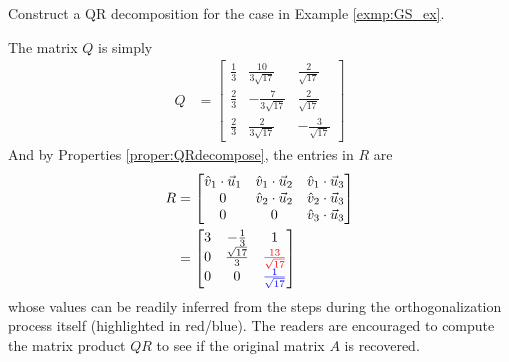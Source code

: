 \begin{exmp}
\label{exmp:QRdecom}
Construct a QR decomposition for the case in Example \ref{exmp:GS_ex}.
\end{exmp}
\begin{solution}
The matrix $Q$ is simply
\begin{align*}
Q &= 
\begin{bmatrix}
\frac{1}{3} & \frac{10}{3\sqrt{17}} & \frac{2}{\sqrt{17}} \\
\frac{2}{3} & -\frac{7}{3\sqrt{17}} & \frac{2}{\sqrt{17}} \\
\frac{2}{3} & \frac{2}{3\sqrt{17}} & -\frac{3}{\sqrt{17}}
\end{bmatrix}
\end{align*}
And by Properties \ref{proper:QRdecompose}, the entries in $R$ are
\begin{align*}
R &= 
\begin{bmatrix}
\hat{v}_1 \cdot \vec{u}_1 &  \hat{v}_1 \cdot \vec{u}_2 & \hat{v}_1 \cdot \vec{u}_3 \\
0 & \hat{v}_2 \cdot \vec{u}_2 &  \hat{v}_2 \cdot \vec{u}_3 \\
0 & 0 & \hat{v}_3 \cdot \vec{u}_3 
\end{bmatrix}  \\
&= 
\begin{bmatrix}
3 & -\frac{1}{3} & 1 \\
0 & \frac{\sqrt{17}}{3} & \textcolor{red}{\frac{13}{\sqrt{17}}}  \\
0 & 0 & \textcolor{blue}{\frac{1}{\sqrt{17}}} \\
\end{bmatrix} 
\end{align*}
whose values can be readily inferred from the steps during the orthogonalization process itself (highlighted in red/blue). The readers are encouraged to compute the matrix product $QR$ to see if the original matrix $A$ is recovered.
\end{solution}

